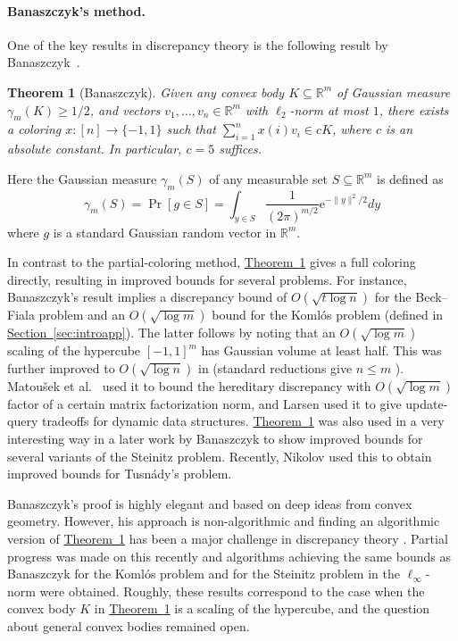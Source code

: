 \documentclass[11pt]{article}
\numberwithin{equation}{section}
\newtheorem{theorem}{Theorem}[section]
\theoremstyle{definition}
\theoremstyle{plain}
\newcommand{\eee}{\mathrm e}
\newcommand{\expref}[2]{\hyperref[#2]{#1~\ref{#2}}}
\begin{document}
\paragraph{Banaszczyk's method.} One of the key results in discrepancy
theory %
is the following result by
Banaszczyk~\cite{B97}.  %
%
%
\begin{theorem}[Banaszczyk]\label{thm:bana}  %
Given any convex body $K\subseteq \mathbb{R}^m$ of Gaussian measure $\gamma_m(K)\ge 1/2$, and vectors $v_1,\dots,v_n\in\mathbb{R}^m$ with $\ell_2$-norm at most $1$, there exists a coloring $x:[n]\rightarrow\{-1,1\}$ such that $\sum_{i=1}^n x(i) v_i \in cK$, where $c$ is an absolute constant. In particular, $c=5$ suffices.
\end{theorem}

Here the Gaussian measure $\gamma_m(S)$ of any measurable set $S\subseteq \mathbb{R}^m$ is defined as
\[\gamma_m(S)= \Pr[g \in S]= \int_{y\in S} \frac{1}{(2\pi)^{m/2}}  \eee^{-\| y\|^2/2}  dy \]
where $g$ is a standard Gaussian random vector in $\mathbb{R}^m$.

In contrast to the partial-coloring method, \expref{Theorem}{thm:bana} gives a full coloring directly, resulting in improved bounds for several problems. For instance, Banaszczyk's result implies a discrepancy bound of $O(\sqrt{t\log n})$ for the Beck--Fiala problem and an $O(\sqrt{\log m})$ bound for the Koml\'{o}s problem (defined in \expref{Section}{sec:introapp}). The latter follows by noting that an $O(\sqrt{\log m})$ scaling of the hypercube $[-1,1]^m$ has Gaussian volume at least half. This was further improved to $O(\sqrt{\log n})$ in \cite{barthe2005} (standard reductions give $n \le m$ \cite{BF81}). Matou\v{s}ek et al.~\cite{MNT14} used it to bound the hereditary discrepancy with $O(\sqrt{\log m})$ factor of a certain matrix factorization norm, and Larsen \cite{Lar14}
used it to give update-query tradeoffs for dynamic data structures.
\expref{Theorem}{thm:bana} was also used in a very interesting way in a later work by Banaszczyk \cite{Bana12} to show improved bounds for several variants of the Steinitz problem. Recently, Nikolov \cite{Sasho16} used this to obtain improved bounds for Tusn\'{a}dy's problem.


Banaszczyk's proof is highly elegant and based on deep ideas from convex geometry. However, his approach is non-algorithmic and finding an algorithmic version of \expref{Theorem}{thm:bana} has been a major challenge in discrepancy
theory  %
\cite{Rot14, Sashothesis, DGLN16}. Partial progress was made on this recently  \cite{BDG16, BG17,harish17} and algorithms achieving the same bounds as Banaszczyk for the Koml\'{o}s problem and for the Steinitz problem in the $\ell_\infty$-norm were obtained. Roughly, these results correspond to the case when the convex body $K$ in \expref{Theorem}{thm:bana} is a scaling of the hypercube, and the question about general convex bodies remained open.
\end{document}
